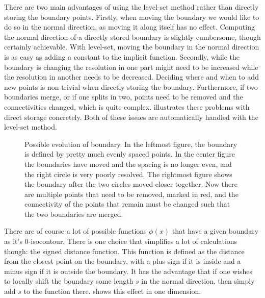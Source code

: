 There are two main advantages of using the level-set method rather than
directly storing the boundary points.
Firstly, when moving the boundary we would like to do so in the normal
direction, as moving it along itself has no effect.
Computing the normal direction of a directly stored boundary is slightly cumbersome,
though certainly achievable.
With level-set, moving the boundary in the normal direction is as easy as adding
a constant to the implicit function.
Secondly, while the boundary is changing the resolution in one part might need
to be increased while the resolution in another needs to be decreased. Deciding
where and when to add new points is non-trivial when directly storing the
boundary. Furthermore, if two boundaries merge, or if one splits in two, points
need to be removed and the connectivities changed, which is quite complex.
 illustrates these problems with direct storage concretely.
Both of these issues are automatically handled with the level-set method.

\begin{figure}[htpb]
	\centering
	
	\caption{%
		Possible evolution of boundary. In the leftmost figure, the
		boundary is defined by pretty much evenly spaced points. In the center figure
		the boundaries have moved and the spacing is no longer even, and the
		right circle is very poorly resolved.
		The rightmost figure shows the boundary after the two circles moved
		closer together. Now there are multiple points that need to be removed,
		marked in red, and the connectivity of the points that remain must be
		changed such that the two boundaries are merged.
	}
	\label{fig:direct_troubles}
\end{figure}

There are of course a lot of possible functions $\phi(x)$ that have a given
boundary as it's 0-isocontour.
There is one choice that simplifies a lot of calculations though: the signed
distance function.
This function is defined as the distance from the closest point on the boundary,
with a plus sign if it is inside and a minus sign if it is outside the boundary.
It has the advantage that if one wishes to locally shift the boundary some
length $s$ in the normal direction, then simply add $s$ to the function there.
 shows this effect in one dimension.

